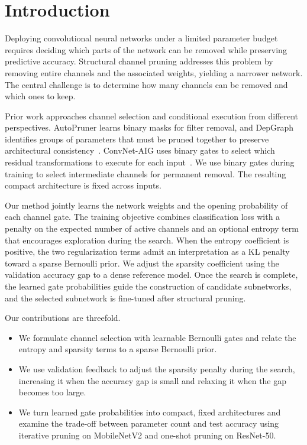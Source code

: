 \documentclass[sigplan,screen]{acmart}
\begin{document}

\section{Introduction}

Deploying convolutional neural networks under a limited parameter budget requires deciding which parts of the network can be removed while preserving predictive accuracy. Structural channel pruning addresses this problem by removing entire channels and the associated weights, yielding a narrower network. The central challenge is to determine how many channels can be removed and which ones to keep.

Prior work approaches channel selection and conditional execution from different perspectives. AutoPruner learns binary masks for filter removal, and DepGraph identifies groups of parameters that must be pruned together to preserve architectural consistency~\cite{luo2020autopruner,fang2023depgraph}. ConvNet-AIG uses binary gates to select which residual transformations to execute for each input~\cite{veit2018convnet}. We use binary gates during training to select intermediate channels for permanent removal. The resulting compact architecture is fixed across inputs.

Our method jointly learns the network weights and the opening probability of each channel gate. The training objective combines classification loss with a penalty on the expected number of active channels and an optional entropy term that encourages exploration during the search. When the entropy coefficient is positive, the two regularization terms admit an interpretation as a KL penalty toward a sparse Bernoulli prior. We adjust the sparsity coefficient using the validation accuracy gap to a dense reference model. Once the search is complete, the learned gate probabilities guide the construction of candidate subnetworks, and the selected subnetwork is fine-tuned after structural pruning.

Our contributions are threefold.

\begin{itemize}
    \item We formulate channel selection with learnable Bernoulli gates and relate the entropy and sparsity terms to a sparse Bernoulli prior.
    \item We use validation feedback to adjust the sparsity penalty during the search, increasing it when the accuracy gap is small and relaxing it when the gap becomes too large.
    \item We turn learned gate probabilities into compact, fixed architectures and examine the trade-off between parameter count and test accuracy using iterative pruning on MobileNetV2 and one-shot pruning on ResNet-50.
\end{itemize}
\end{document}
